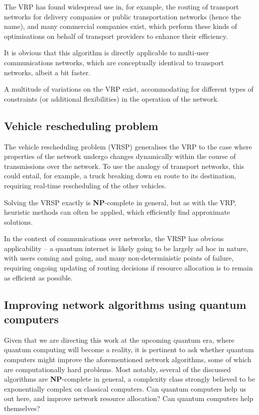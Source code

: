 The VRP has found widespread use in, for example, the routing of transport networks for delivery companies or public transportation networks (hence the name), and many commercial companies exist, which perform these kinds of optimisations on behalf of transport providers to enhance their efficiency.

It is obvious that this algorithm is directly applicable to multi-user communications networks, which are conceptually identical to transport networks, albeit a bit faster. 

A multitude of variations on the VRP exist, accommodating for different types of constraints (or additional flexibilities) in the operation of the network.

%
%

\subsection{Vehicle rescheduling problem} \label{sec:VRSP} 

The vehicle rescheduling problem (VRSP) generalises the VRP to the case where properties of the network undergo changes dynamically within the course of transmissions over the network. To use the analogy of transport networks, this could entail, for example, a truck breaking down en route to its destination, requiring real-time rescheduling of the other vehicles.

Solving the VRSP exactly is \textbf{NP}-complete in general, but as with the VRP, heuristic methods can often be applied, which efficiently find approximate solutions.

In the context of communications over networks, the VRSP has obvious applicability -- a quantum internet is likely going to be largely ad hoc in nature, with users coming and going, and many non-deterministic points of failure, requiring ongoing updating of routing decisions if resource allocation is to remain as efficient as possible.

%
%

\subsection{Improving network algorithms using quantum computers} 

Given that we are directing this work at the upcoming quantum era, where quantum computing will become a reality, it is pertinent to ask whether quantum computers might improve the aforementioned network algorithms, some of which are computationally hard problems. Most notably, several of the discussed algorithms are \textbf{NP}-complete in general, a complexity class strongly believed to be exponentially complex on classical computers. Can quantum computers help us out here, and improve network resource allocation? Can quantum computers help themselves?

